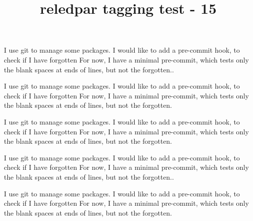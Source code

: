 \documentclass{book}
\title{reledpar tagging test - 15}
\begin{document}
\tableofcontents

\beforeeledchapter

\begin{pairs}
\begin{Leftside}
\beginnumbering
\pstart
{}
\pend

\pstart
I use git to manage some packages.
I would like to add a pre-commit hook, to check if I have forgotten
For now, I have a minimal pre-commit, which tests only the blank spaces at ends of lines, but not the forgotten..
\pend

\pstart
{}
\pend

\pstart
{}
\pend

\pstart
{}
\pend

\pstart
I use git to manage some packages.
I would like to add a pre-commit hook, to check if I have forgotten
For now, I have a minimal pre-commit, which tests only the blank spaces at ends of lines, but not the forgotten.
\pend

\pstart
{}
\pend

\pstart
I use git to manage some packages.
I would like to add a pre-commit hook, to check if I have forgotten
For now, I have a minimal pre-commit, which tests only the blank spaces at ends of lines, but not the forgotten.
\pend



\endnumbering
\end{Leftside}

\begin{Rightside}

\beginnumbering
\pstart
{}
\pend

\pstart
I use git to manage some packages.
I would like to add a pre-commit hook, to check if I have forgotten
For now, I have a minimal pre-commit, which tests only the blank spaces at ends of lines, but not the forgotten..
\pend

\pstart
{}
\pend

\pstart
{}
\pend

\pstart
{}
\pend

\pstart
I use git to manage some packages.
I would like to add a pre-commit hook, to check if I have forgotten
For now, I have a minimal pre-commit, which tests only the blank spaces at ends of lines, but not the forgotten.
\pend


\end{Rightside}
\end{pairs}
\end{document}
